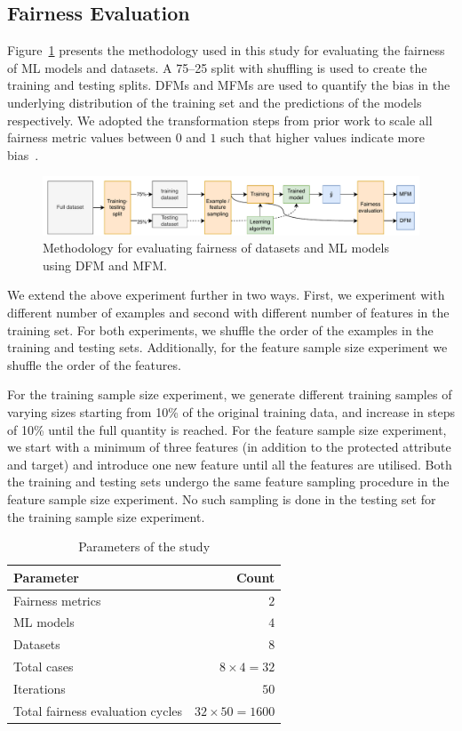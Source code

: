 \documentclass{article}
\begin{document}
\subsection{Fairness Evaluation}\label{sec:method-fair-eval}

Figure \ref{fig:method} presents the methodology used in this study
for evaluating the fairness of ML models and datasets. A 75--25 split
with shuffling is used to create the training and testing splits. DFMs
and MFMs are used to quantify the bias in the underlying distribution
of the training set and the predictions of the models respectively. We
adopted the transformation steps from prior work to scale all fairness
metric values between $0$ and $1$ such that higher values indicate
more bias \cite{zhang2021ignorance,hort2021fairea}.

\begin{figure}
  \centering
  \includegraphics[width=0.95\linewidth]{method.pdf}
  \caption{Methodology for evaluating fairness of datasets and ML
  models using DFM and MFM.}
  \label{fig:method}
\end{figure}

We extend the above experiment further in two ways. First, we
experiment with different number of examples and second with different
number of features in the training set. For both experiments, we
shuffle the order of the examples in the training and testing
sets. Additionally, for the feature sample size experiment we shuffle
the order of the features.

For the training sample size experiment, we generate different
training samples of varying sizes starting from 10\% of the original
training data, and increase in steps of 10\% until the full quantity
is reached. For the feature sample size experiment, we start with
a minimum of three features (in addition to the protected attribute
and target) and introduce one new feature until all the features are
utilised. Both the training and testing sets undergo the same feature
sampling procedure in the feature sample size experiment. No such
sampling is done in the testing set for the training sample size
experiment.

\begin{table}
  \centering
  \begin{tabular}{l r}
    \toprule
    \textbf{Parameter} & \textbf{Count}\\
    \midrule
    Fairness metrics & $2$\\
    ML models & $4$\\
    Datasets & $8$\\
    Total cases & $8\times4=32$\\
    Iterations & $50$\\
    Total fairness evaluation cycles & $32\times50=1600$\\
    \bottomrule
  \end{tabular}
  \caption{Parameters of the study}
  \label{tab:parameters}
\end{table}
\end{document}
